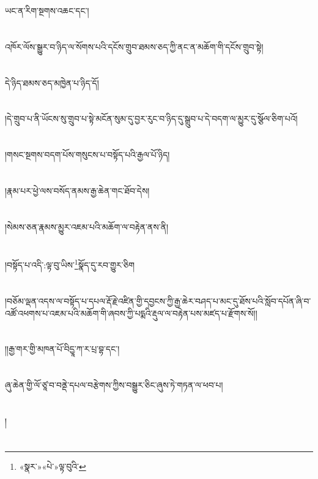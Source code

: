 ཡང་ན་རིག་སྔགས་འཆང་དང་།\chapter{ }འཁོར་ལོས་སྒྱུར་བ་ཉིད་ལ་སོགས་པའི་དངོས་གྲུབ་ཐམས་ཅད་ཀྱི་ནང་ན་མཆོག་གི་དངོས་གྲུབ་སྟེ།\chapter{ }དེ་ཉིད་ཐམས་ཅད་མཁྱེན་པ་ཉིད་དོ།\chapter{ }།དེ་གྲུབ་པ་ནི་ཡོངས་སུ་གྲུབ་པ་སྟེ་མངོན་སུམ་དུ་བྱར་རུང་བ་ཉིད་དུ་སྒྲུབ་པ་དེ་བདག་ལ་མྱུར་དུ་སྩོལ་ཅིག་པའོ།\chapter{ }།གསང་སྔགས་བདག་པོས་གསུངས་པ་བསྟོད་པའི་རྒྱལ་པོ་ཉིད།\chapter{ }།རྣམ་པར་ཕྱེ་ལས་བསོད་ནམས་རྒྱ་ཆེན་གང་ཐོབ་དེས།\chapter{ }།སེམས་ཅན་རྣམས་མྱུར་འཇམ་པའི་མཆོག་ལ་བརྟེན་ནས་ནི།\chapter{ }།བསྟོད་པ་འདི་:ལྟ་བུ་ཡིས་\footnote{«སྣར་»«པེ་»ལྟ་བུའི་}སྣོད་དུ་རབ་གྱུར་ཅིག\chapter{ }།བཅོམ་ལྡན་འདས་ལ་བསྟོད་པ་དཔལ་རྡོ་རྗེ་འཛིན་གྱི་དབྱངས་ཀྱི་རྒྱ་ཆེར་བཤད་པ་མང་དུ་ཐོས་པའི་སློབ་དཔོན་ཞི་བ་འཚོ་འཕགས་པ་འཇམ་པའི་མཆོག་གི་ཞབས་ཀྱི་པདྨའི་རྡུལ་ལ་བརྟེན་པས་མཛད་པ་རྫོགས་སོ།།\chapter{ }།།རྒྱ་གར་གྱི་མཁན་པོ་བིདྱཱ་ཀ་ར་པྲ་བྷ་དང་།\chapter{ }ཞུ་ཆེན་གྱི་ལོ་ཙཱ་བ་བནྡེ་དཔལ་བརྩེགས་ཀྱིས་བསྒྱུར་ཅིང་ཞུས་ཏེ་གཏན་ལ་ཕབ་པ།\chapter{ }།\chapter{ }